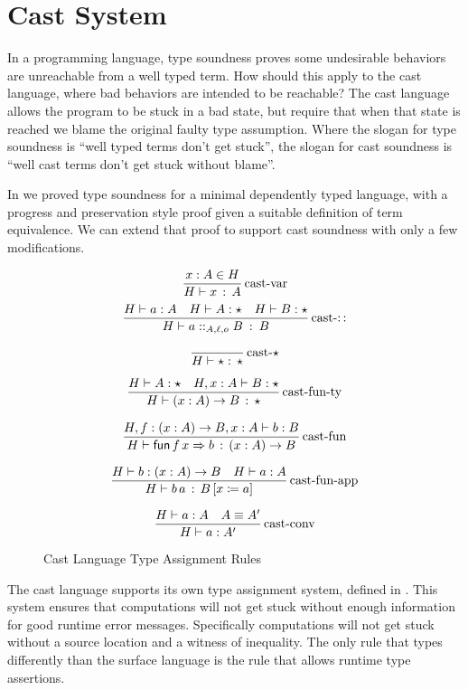 \section{Cast System}

In a programming language, type soundness proves some undesirable behaviors are unreachable from a well typed term.
How should this apply to the cast language, where bad behaviors are intended to be reachable?
The cast language allows the program to be stuck in a bad state, but require that when that state is reached we blame the original faulty type assumption.
Where the slogan for type soundness is ``well typed terms don't get stuck'', the slogan for cast soundness is ``well cast terms don't get stuck without blame''.

In  we proved type soundness for a minimal dependently typed language, with a progress and preservation style proof given a suitable definition of term equivalence.
We can extend that proof to support cast soundness with only a few modifications.

\begin{figure}
\[
\frac{x:A\in H}{H\vdash x\,:\,A}
\operatorname{cast-var}
\]
\[
\frac{H\vdash a:A\quad H\vdash A:\star\quad H\vdash B:\star}{H\vdash a::_{A,\ell ,o}B\::\:B}
\operatorname{cast-::}
\]

\[
\frac{\,}{H\vdash\star:\,\star}
\operatorname{cast-\star}
\]

\[
\frac{H\vdash A:\star\quad H,x:A\vdash B:\star}{H\vdash\left(x:A\right)\rightarrow B\,:\,\star}
\operatorname{cast-fun-ty}
\]

\[
\frac{H,f:\left(x:A\right)\rightarrow B,x:A\vdash b:B}{H\vdash\mathsf{fun}\,f\,x\Rightarrow b\,:\,\left(x:A\right)\rightarrow B}
\operatorname{cast-fun}
\]

\[
\frac{H\vdash b:\left(x:A\right)\rightarrow B\quad H\vdash a:A}{H\vdash b\,a\,:\,B\left[x\coloneqq a\right]}
\operatorname{cast-fun-app}
\]

\[
\frac{H\vdash a:A\quad A\equiv A'}{H\vdash a:A'}
\operatorname{cast-conv}
\]


\caption{Cast Language Type Assignment Rules}
\label{fig:cast-tas-rules}
\end{figure}

The cast language supports its own type assignment system, defined in .
This system ensures that computations will not get stuck without enough information for good runtime error messages.
Specifically computations will not get stuck without a source location and a witness of inequality.
The only rule that types differently than the surface language is the  rule that allows runtime type assertions. 

